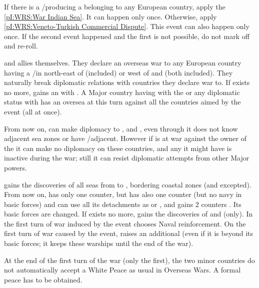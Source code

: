 \condition{}
\aparag If there is a \TP/\COL producing a \POSPICE belonging to any European
country, apply the \ref{pI:WRS:War Indian Sea}. It can happen only once.
\aparag Otherwise, apply \ref{pI:WRS:Veneto-Turkish Commercial Dispute}.  This
event can also happen only once.
\aparag If the second event happened and the first is not possible, do not
mark off and re-roll.



\phevnt
\aparag \paysEgypte and \paysGujerat allies themselves.  They declare an
overseas war to any European country having a \TP/\COL in \continentAfrica
north-east of \granderegionNatal (included) or \continentAsia west of
\granderegionMalaisie and \granderegionSumatra (both included). They naturally
break diplomatic relations with countries they declare war to.
\bparag If \paysEgypte exists no more, \TUR gains an \dipAT with \paysGujerat.
\aparag A Major country having  with the \paysGujerat or any
diplomatic status with \paysEgypte has an oversea \CB at this turn against all
the countries aimed by the event (all at once).

\phdipl
\aparag From now on, \VEN can make diplomacy to \paysAden, \paysOman and
\paysGujerat, even through it does not know adjacent sea zones or have
\TP/\COL adjacent. However if \VEN is at war against the owner of the
 it can make no diplomacy on these countries, and any
 it might have is inactive during the war; still it can resist
diplomatic attempts from other Major powers.

\phadm
\aparag \paysEgypte gains the discoveries of all seas from
 to , bordering coastal zones (and
 excepted). From now on, \paysEgypte has only one \ARMY
counter, but has also one \FLEET counter (but no navy in basic forces) and can
use all its detachments as \LD or \ND, and gains 2 counters \LDENDE. Its basic
forces are changed.
\bparag If \paysEgypte exists no more, \TUR gains the discoveries of
 and  (only).
\aparag In the first turn of war induced by the event \paysEgypte chooses
Naval reinforcement.
\aparag On the first turn of war caused by the event, \paysGujerat raises an
additional \FLEET\facemoins (even if it is beyond its basic forces; it keeps
these warships until the end of the war).

\phpaix
\aparag At the end of the first turn of the war (only the first), the two
minor countries do not automatically accept a White Peace as usual in Overseas
Wars.  A formal peace has to be obtained.


